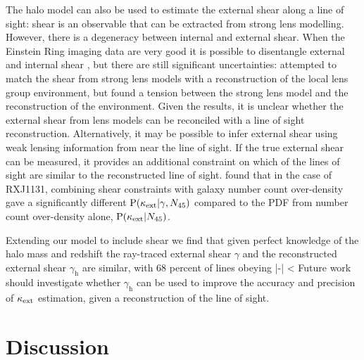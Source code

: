 \documentclass[useAMS,usenatbib,a4paper]{mn2e}
\begin{document}
The halo model can also be used to estimate the external shear along a line of
sight: shear is an observable that can be extracted from strong lens
modelling. However, there is a degeneracy between internal and external shear.
When the Einstein Ring imaging data are very good it is possible to
disentangle external and internal shear \citep[\eg][]{SuyuEtal2010}, but there
are still significant uncertainties: \citet{WongEtal2011} attempted to match
the shear from strong lens models with a reconstruction of the local lens
group environment, but found a tension between the strong lens model and the
reconstruction of the environment. Given the \citet{WongEtal2011} results, it
is unclear whether the external shear from lens models can be reconciled with
a line of sight reconstruction. Alternatively, it may be possible  to infer
external shear using weak lensing information from near the line of sight.  If
the true external shear can be measured, it provides an additional constraint
on which of the \MS lines of sight are similar to the reconstructed line of
sight. \citet{SuyuEtal2012} found that in the case of 
RXJ1131, combining shear constraints
with galaxy number count over-density gave a significantly different
${\rm P}(\kappa_{\rm ext}|\gamma,N_{45})$ compared to the PDF from number count
over-density alone, ${\rm P}(\kappa_{\rm ext}|N_{45})$.

Extending our model to include shear we find that given
perfect knowledge of the halo mass and redshift the ray-traced external shear
$\gamma$ and the reconstructed external shear $\gamma_{\mathrm{h}}$  are
similar, with 68 percent of lines obeying
\be
\label{eq:shearineq}
|{\boldmath{\gammax}-}| < 
\ee 
Future work should investigate whether $\gamma_{\mathrm{h}}$ can be used
to improve the accuracy and precision of $\kappa_{\rm ext}$ estimation, given a
reconstruction of the line of sight. 



\section{Discussion}
\label{sec:discuss}
\end{document}
